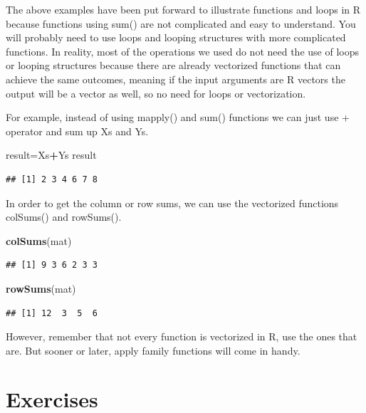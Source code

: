 \documentclass[12pt,]{krantz}
\newenvironment{Shaded}{\begin{snugshade}}{\end{snugshade}}
\newcommand{\KeywordTok}[1]{\textcolor[rgb]{0.13,0.29,0.53}{\textbf{#1}}}
\newcommand{\NormalTok}[1]{#1}
\newcommand{\OperatorTok}[1]{\textcolor[rgb]{0.81,0.36,0.00}{\textbf{#1}}}
\begin{document}
The above examples have been put forward to illustrate functions and loops in R because functions using sum() are not complicated and easy to understand. You will probably need to use loops and looping structures with more complicated functions. In reality, most of the operations we used do not need the use of loops or looping structures because there are already vectorized functions that can achieve the same outcomes, meaning if the input arguments are R vectors the output will be a vector as well, so no need for loops or vectorization.

For example, instead of using mapply() and sum() functions we can just use + operator and sum up Xs and Ys.

\begin{Shaded}
\begin{Highlighting}[]
\NormalTok{result=Xs}\OperatorTok{+}\NormalTok{Ys}
\NormalTok{result}
\end{Highlighting}
\end{Shaded}

\begin{verbatim}
## [1] 2 3 4 6 7 8
\end{verbatim}

In order to get the column or row sums, we can use the vectorized functions colSums() and rowSums().

\begin{Shaded}
\begin{Highlighting}[]
\KeywordTok{colSums}\NormalTok{(mat)}
\end{Highlighting}
\end{Shaded}

\begin{verbatim}
## [1] 9 3 6 2 3 3
\end{verbatim}

\begin{Shaded}
\begin{Highlighting}[]
\KeywordTok{rowSums}\NormalTok{(mat)}
\end{Highlighting}
\end{Shaded}

\begin{verbatim}
## [1] 12  3  5  6
\end{verbatim}

However, remember that not every function is vectorized in R, use the ones that are. But sooner or later, apply family functions will come in handy.

\hypertarget{exercises}{%
\section{Exercises}\label{exercises}}
\end{document}
